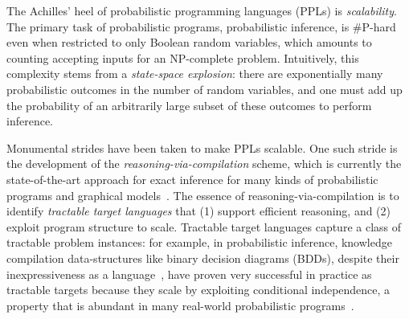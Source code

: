 The Achilles' heel of probabilistic programming languages (PPLs) is \textit{scalability}.
The primary task of probabilistic programs,
probabilistic inference,
is \#P-hard~\citep{roth1996hardness} even when restricted to only Boolean random variables,
which amounts to counting accepting inputs
for an NP-complete problem.
Intuitively, this complexity stems from a \textit{state-space explosion}:
there are exponentially many probabilistic outcomes in the number of random variables,
and one must add up the probability of an
arbitrarily large subset of these outcomes to perform inference.

Monumental strides have been taken to make PPLs scalable.
One such stride is the development of the \textit{reasoning-via-compilation} scheme,
which is currently the
state-of-the-art approach for exact inference for many kinds of
probabilistic programs and graphical models~\citep{holtzen2020scaling,fierens2015inference,li2023scallop}.
The essence of reasoning-via-compilation is to identify \emph{tractable target
languages} that (1) support efficient reasoning, and (2) exploit
program structure to scale.
Tractable target languages capture a class of tractable problem
instances:
for example, in probabilistic
inference, knowledge compilation data-structures like binary decision diagrams (BDDs),
despite their inexpressiveness as a language~\citep{darwiche2002knowledge},
have proven very successful in practice as tractable targets because
they scale by exploiting conditional independence, a property that is abundant in many
real-world probabilistic programs~\citep{holtzen2020scaling}.


